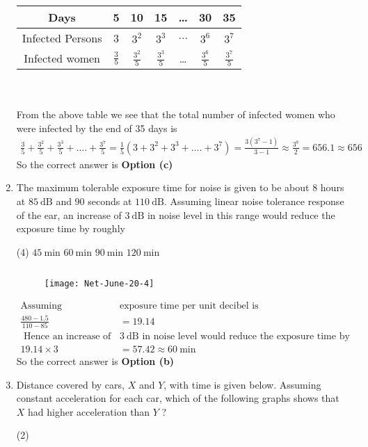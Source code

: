 \begin{enumerate}
\begin{answer}
\begin{tabular}{|c|c|c|c|c|c|c|}
		\hline Days & 5 & 10 & 15 &\dots &30&35\\
		\hline Infected Persons& 3 & $3^{2}$ & $3^{3}$ &$\dots$& $3^{6}$& $3^{7}$\\
		\hline Infected  women  & $\frac{3}{5}$ & $\frac{3^{2}}{5}$ & $\frac{3^{3}}{5}$&\dots &$\frac{3^{6}}{5}$&$\frac{3^{7}}{5}$\\\hline
	\end{tabular}\\\\
From the above table we see that the total number of infected women who were infected by the end of 35 days is
	\begin{align*}
\frac{3}{5}+\frac{3^{2}}{5}+\frac{3^{3}}{5}+\ldots .+\frac{3^{7}}{5}=\frac{1}{5}\left(3+3^{2}+3^{3}+\ldots .+3^{7}\right)=\frac{3\left(3^{7}-1\right)}{3-1} \approx \frac{3^{8}}{2}=656.1 \approx 656
	\end{align*}
		So the correct answer is \textbf{Option (c)}
\end{answer}
\item The maximum tolerable exposure time for noise is given to be about 8 hours at $85 \mathrm{~dB}$ and 90 seconds at $110 \mathrm{~dB}$. Assuming linear noise tolerance response of the ear, an increase of $3 \mathrm{~dB}$ in noise level in this range would reduce the exposure time by roughly
 \begin{tasks}(4)
	\task[\textbf{a.}]$45 \mathrm{~min}$
	\task[\textbf{b.}]$60 \mathrm{~min}$
	\task[\textbf{c.}]$90 \mathrm{~min}$
	\task[\textbf{d.}]$120 \mathrm{~min}$ 
\end{tasks}
\begin{answer}$\left. \right. $
	\begin{figure}[H]
		\centering
		\texttt{[image: Net-June-20-4]}
	\end{figure}
	\begin{align*}
	\text{Assuming linearization }&\text{exposure time per unit decibel is}\\
	\frac{480-1.5}{110-85}&=19.14\\
\text{	Hence an increase of }&\text{$3 \mathrm{~dB}$ in noise level would reduce the exposure time by roughly}\\
	19.14 \times 3&=57.42 \approx 60 \mathrm{~min}
	\end{align*}
	So the correct answer is \textbf{Option (b)}
\end{answer}
\item Distance covered by cars, $X$ and $Y$, with time is given below. Assuming constant acceleration for each car, which of the following graphs shows that $X$ had higher acceleration than $Y$ ? \begin{tasks}(2)

\end{tasks}
\end{enumerate}
